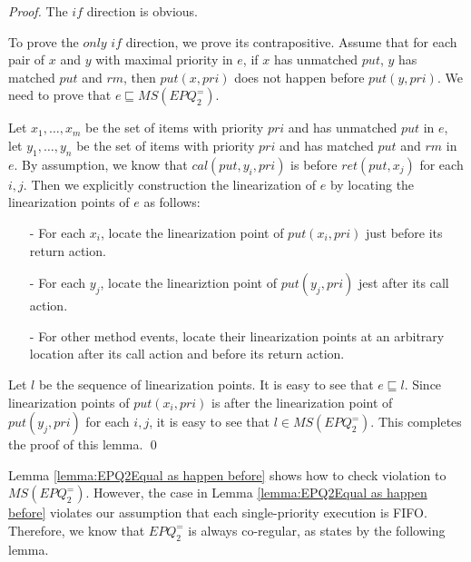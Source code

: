 \begin {proof}

The $\textit{if}$ direction is obvious.

To prove the $\textit{only if}$ direction, we prove its contrapositive. Assume that for each pair of $x$ and $y$ with maximal priority in $e$, if $x$ has unmatched $\textit{put}$, $y$ has matched $\textit{put}$ and $\textit{rm}$, then $\textit{put}(x,\textit{pri})$ does not happen before $\textit{put}(y,\textit{pri})$. We need to prove that $e \sqsubseteq \textit{MS}(\textit{EPQ}_2^{=})$.

Let $x_1,\ldots,x_m$ be the set of items with priority $\textit{pri}$ and has unmatched $\textit{put}$ in $e$, let $y_1,\ldots,y_n$ be the set of items with priority $\textit{pri}$ and has matched $\textit{put}$ and $\textit{rm}$ in $e$. By assumption, we know that $\textit{cal}(\textit{put},y_i,\textit{pri})$ is before $\textit{ret}(\textit{put},x_j)$ for each $i,j$. Then we explicitly construction the linearization of $e$ by locating the linearization points of $e$ as follows:

\begin{itemize}
\setlength{\itemsep}{0.5pt}
\item[-] For each $x_i$, locate the linearization point of $\textit{put}(x_i,\textit{pri})$ just before its return action.

\item[-] For each $y_j$, locate the lineariztion point of $\textit{put}(y_j,\textit{pri})$ jest after its call action.

\item[-] For other method events, locate their linearization points at an arbitrary location after its call action and before its return action.
\end{itemize}

Let $l$ be the sequence of linearization points. It is easy to see that $e \sqsubseteq l$. Since linearization points of $\textit{put}(x_i,\textit{pri})$ is after the linearization point of $\textit{put}(y_j,\textit{pri})$ for each $i,j$, it is easy to see that $l \in \textit{MS}(\textit{EPQ}_2^{=})$. This completes the proof of this lemma. \qed
\end {proof}

Lemma \ref{lemma:EPQ2Equal as happen before} shows how to check violation to $\textit{MS}(\textit{EPQ}_2^{=})$. However, the case in Lemma \ref{lemma:EPQ2Equal as happen before} violates our assumption that each single-priority execution is FIFO. Therefore, we know that $\textit{EPQ}_2^{=}$ is always co-regular, as states by the following lemma.


